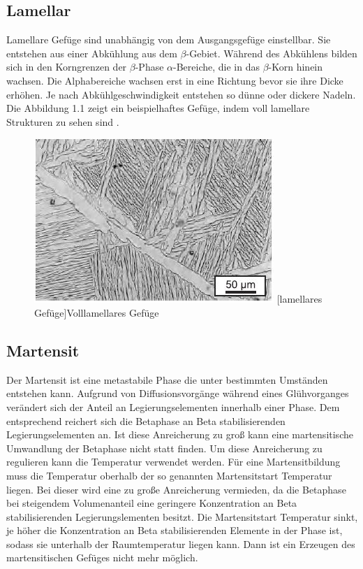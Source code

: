 \documentclass[a4paper, 11pt]{tubsreprt}
\begin{document}
\subsection{Lamellar}
Lamellare Gefüge sind unabhängig von dem Ausgangsgefüge einstellbar. Sie entstehen aus einer Abkühlung aus dem $\beta$-Gebiet. Während des Abkühlens bilden sich in den Korngrenzen der $\beta$-Phase $\alpha$-Bereiche, die in das $\beta$-Korn hinein wachsen. Die Alphabereiche wachsen erst in eine Richtung bevor sie ihre Dicke erhöhen. Je nach Abkühlgeschwindigkeit entstehen so dünne oder dickere Nadeln. Die Abbildung 1.1 zeigt ein beispielhaftes Gefüge, indem voll lamellare Strukturen zu sehen sind \cite{Luetjering2007}.


\begin{figure}


	\centering
		\includegraphics[scale=1]{Bilder/lamellar.jpg}
		[lamellares Gefüge]{Volllamellares Gefüge \cite{Leyens2002}}
		\label{lamellar}
		
\end{figure}
\subsection{Martensit}
Der Martensit ist eine metastabile Phase die unter bestimmten Umständen entstehen kann. Aufgrund von Diffusionsvorgänge während eines Glühvorganges verändert sich der Anteil an Legierungselementen innerhalb einer Phase. Dem entsprechend reichert sich die Betaphase an Beta stabilisierenden Legierungselementen an. Ist diese Anreicherung zu groß kann eine martensitische Umwandlung der Betaphase nicht statt finden. Um diese Anreicherung zu regulieren kann die Temperatur verwendet werden. Für eine Martensitbildung muss die Temperatur oberhalb der so genannten Martensitstart Temperatur liegen. Bei dieser wird eine zu große Anreicherung vermieden, da die Betaphase bei steigendem Volumenanteil eine geringere Konzentration an Beta stabilisierenden Legierungslementen besitzt. Die Martensitstart Temperatur sinkt, je höher die Konzentration an Beta stabilisierenden Elemente in der Phase ist, sodass sie unterhalb der Raumtemperatur liegen kann. Dann ist ein Erzeugen des martensitischen Gefüges nicht mehr möglich.
\end{document}
